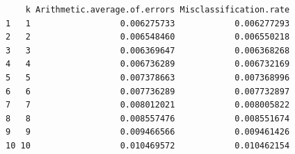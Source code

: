 \documentclass[
  letterpaper,
  DIV=11,
  numbers=noendperiod]{scrartcl}
\begin{document}
\begin{verbatim}
    k Arithmetic.average.of.errors Misclassification.rate
1   1                  0.006275733            0.006277293
2   2                  0.006548460            0.006550218
3   3                  0.006369647            0.006368268
4   4                  0.006736289            0.006732169
5   5                  0.007378663            0.007368996
6   6                  0.007736289            0.007732897
7   7                  0.008012021            0.008005822
8   8                  0.008557476            0.008551674
9   9                  0.009466566            0.009461426
10 10                  0.010469572            0.010462154
\end{verbatim}
\end{document}
